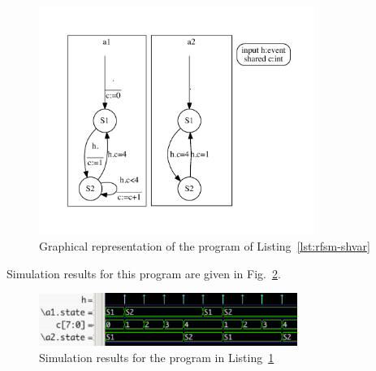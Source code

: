 \begin{figure}
  \centering
\includegraphics[width=0.8\textwidth]{figs/shvar-top} 
  \caption{Graphical representation of the program of Listing~\ref{lst:rfsm-shvar}}
  \label{fig:rfsm-shvar}
\end{figure}

Simulation results for this program are given in Fig.~\ref{fig:rfsm-shvar-vcd}.

\begin{figure}
   \includegraphics[width=0.75\textwidth]{figs/shvar-chrono}
   \centering
  \caption{Simulation results for the program in Listing~\ref{fig:rfsm-shvar}}
  \label{fig:rfsm-shvar-vcd}
\end{figure}


